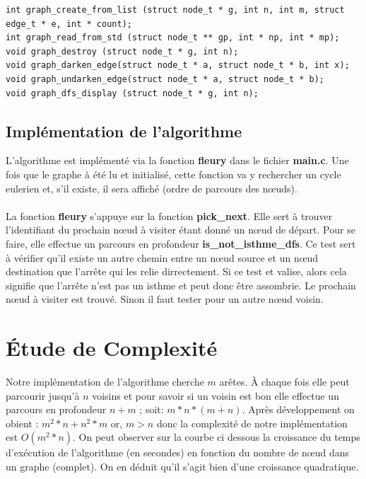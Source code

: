 \documentclass[12pt,a4paper,utf8x]{report}
\begin{document}
    \begin{lstlisting}
int graph_create_from_list (struct node_t * g, int n, int m, struct edge_t * e, int * count);
int graph_read_from_std (struct node_t ** gp, int * np, int * mp);
void graph_destroy (struct node_t * g, int n);
void graph_darken_edge(struct node_t * a, struct node_t * b, int x);
void graph_undarken_edge(struct node_t * a, struct node_t * b);
void graph_dfs_display (struct node_t * g, int n);
    \end{lstlisting}

    \subsection{Implémentation de l'algorithme}
L'algorithme est implémenté via la fonction \textbf{fleury} dans le fichier \textbf{main.c}. Une fois que le graphe à été lu et initialisé, cette fonction va y rechercher un cycle eulerien et, s'il existe, il sera affiché (ordre de parcours des nœuds).
 \\ \\ 
 \indent La fonction \textbf{fleury} s'appuye sur la fonction \textbf{pick\_next}. Elle sert à trouver l'identifiant du prochain nœud à visiter étant donné un nœud de départ. Pour se faire, elle effectue un parcours en profondeur \textbf{is\_not\_isthme\_dfs}. Ce test sert à vérifier qu'il existe un autre chemin entre un nœud source et un nœud destination que l'arrête qui les relie dirrectement. Si ce test et valise, alors cela signifie que l'arrête n'est pas un isthme et peut donc être assombrie. Le prochain nœud à visiter est trouvé. Sinon il faut tester pour un autre nœud voisin.

  \section{Étude de Complexité}
Notre implémentation de l'algorithme cherche $m$ arêtes. À chaque fois elle peut parcourir jusqu'à $n$ voisins et pour savoir si un voisin est bon elle effectue un parcours en profondeur $n + m$ ; 
soit: $m * n * (m + n)$. Après développement on obient : $m^2*n+n^2*m$ or, $m>n$ donc la complexité de notre implémentation est $O(m^2*n)$. On peut observer sur la courbe ci dessous la croissance du temps d'exécution de l'algorithme (en secondes) en fonction du nombre de nœud dans un graphe (complet). On en déduit qu'il s'agit bien d'une croissance quadratique.
\end{document}
